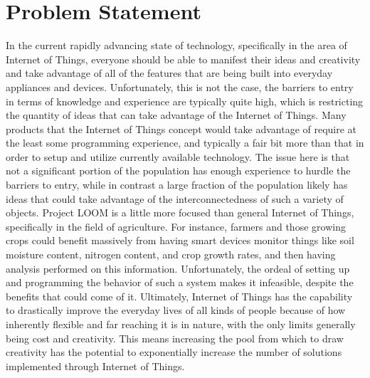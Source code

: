 \documentclass[onecolumn, draftclsnofoot,10pt, compsoc]{IEEEtran}
\begin{document}
\newpage
{}
\tableofcontents
\clearpage

\section{Problem Statement}
In the current rapidly advancing state of technology, specifically in the area of Internet of Things, everyone should be able to manifest their ideas and creativity and take advantage of all of the features that are being built into everyday appliances and devices.
Unfortunately, this is not the case, the barriers to entry in terms of knowledge and experience are typically quite high, which is restricting the quantity of ideas that can take advantage of the Internet of Things.
Many products that the Internet of Things concept would take advantage of require at the least some programming experience, and typically a fair bit more than that in order to setup and utilize currently available technology.
The issue here is that not a significant portion of the population has enough experience to hurdle the barriers to entry, while in contrast a large fraction of the population likely has ideas that could take advantage of the interconnectedness of such a variety of objects.
Project LOOM is a little more focused than general Internet of Things, specifically in the field of agriculture.
For instance, farmers and those growing crops could benefit massively from having smart devices monitor things like soil moisture content, nitrogen content, and crop growth rates, and then having analysis performed on this information. 
Unfortunately, the ordeal of setting up and programming the behavior of such a system makes it infeasible, despite the benefits that could come of it. 
Ultimately, Internet of Things has the capability to drastically improve the everyday lives of all kinds of people because of how inherently flexible and far reaching it is in nature, with the only limits generally being cost and creativity. This means increasing the pool from which to draw creativity has the potential to exponentially increase the number of solutions implemented through Internet of Things.
\end{document}
